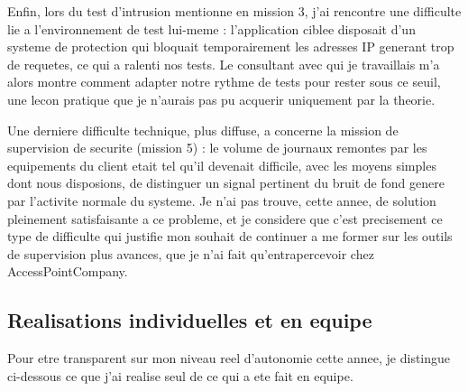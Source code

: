 \documentclass[11pt,a4paper]{article}
\begin{document}
Enfin, lors du test d'intrusion mentionne en mission 3, j'ai rencontre une difficulte lie a l'environnement de test lui-meme : l'application ciblee disposait d'un systeme de protection qui bloquait temporairement les adresses IP generant trop de requetes, ce qui a ralenti nos tests. Le consultant avec qui je travaillais m'a alors montre comment adapter notre rythme de tests pour rester sous ce seuil, une lecon pratique que je n'aurais pas pu acquerir uniquement par la theorie.

Une derniere difficulte technique, plus diffuse, a concerne la mission de supervision de securite (mission 5) : le volume de journaux remontes par les equipements du client etait tel qu'il devenait difficile, avec les moyens simples dont nous disposions, de distinguer un signal pertinent du bruit de fond genere par l'activite normale du systeme. Je n'ai pas trouve, cette annee, de solution pleinement satisfaisante a ce probleme, et je considere que c'est precisement ce type de difficulte qui justifie mon souhait de continuer a me former sur les outils de supervision plus avances, que je n'ai fait qu'entrapercevoir chez AccessPointCompany.

\subsection{Realisations individuelles et en equipe}

Pour etre transparent sur mon niveau reel d'autonomie cette annee, je distingue ci-dessous ce que j'ai realise seul de ce qui a ete fait en equipe.
\end{document}
